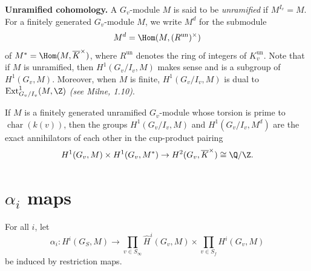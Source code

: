 \documentclass[11pt]{article}
\begin{document}
\bigskip
\noindent\textbf{Unramified cohomology.}
A \( G_v \)-module \( M \) is said to be \emph{unramified} if \( M^{I_v} = M \).
For a finitely generated \( G_v \)-module \( M \), we write \( M^d \) for the submodule
\[ M^d = \Hom(M, (R^{\operatorname{un}})^\times) \]
of \( M^* = \Hom(M, \overline{K}^\times) \), where \( R^{\operatorname{un}} \) denotes
the ring of integers of \( K_v^{\operatorname{un}} \). Note that if \( M \) is
unramified, then \( H^1(G_v/I_v, M) \) makes sense and is a subgroup of
\( H^1(G_v, M) \). Moreover, when \( M \) is finite, \( H^1(G_v/I_v, M) \) is dual
to \( \operatorname{Ext}^1_{G_v/I_v}(M, \Z) \) \textit{(see Milne, 1.10)}.

\begin{thm}
    If \( M \) is a finitely generated unramified \( G_v \)-module whose torsion is
    prime to \( \operatorname{char}(k(v)) \), then the groups
    \( H^1(G_v/I_v, M) \) and \( H^1(G_v/I_v, M^d) \) are the exact annihilators
    of each other in the cup-product pairing
    \[ H^1(G_v, M) \times H^1(G_v, M^*) \to H^2(G_v, \overline{K}^\times) \cong \Q/\Z. \]
\end{thm}

\section{$\alpha_i$ maps}
For all \( i \), let
\[ \alpha_i: H^i(G_{S},M)\to \prod_{v\in S_\infty}\widehat{H}^i(G_v,M)\times\prod_{v\in S_f}H^i(G_v,M) \]
be induced by restriction maps.
\end{document}
